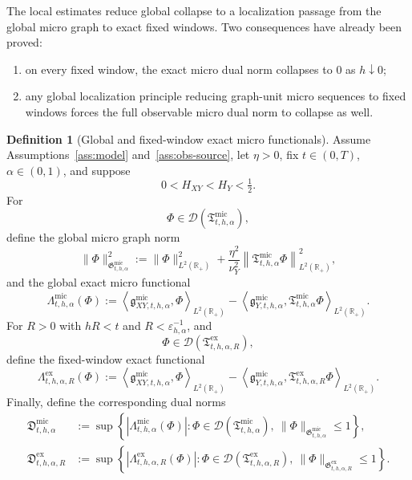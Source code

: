 \documentclass[11pt,a4paper]{amsart}
\theoremstyle{plain}
\theoremstyle{definition}
\newtheorem{definition}[theorem]{Definition}
\theoremstyle{remark}
\newcommand{\R}{\mathbb{R}}
\begin{document}
The local estimates reduce global collapse to a localization passage from the global micro graph to
exact fixed windows.  Two consequences have already been proved:
\begin{enumerate}[label=(\roman*)]
\item on every fixed window, the exact micro dual norm collapses to \(0\) as \(h\downarrow0\);
\item any global localization principle reducing graph-unit micro sequences to fixed windows forces
the full observable micro dual norm to collapse as well.
\end{enumerate}

\begin{definition}[Global and fixed-window exact micro functionals]
\label{def:micro-dual}
Assume Assumptions~\ref{ass:model} and~\ref{ass:obs-source}, let \(\eta>0\), fix \(t\in(0,T)\),
\(\alpha\in(0,1)\), and suppose
\[
0<H_{XY}<H_Y<\tfrac12.
\]
For
\[
\Phi\in\mathcal D(\mathfrak T_{t,h,\alpha}^{\mathrm{mic}}),
\]
define the global micro graph norm
\begin{equation}\label{eq:micro-global-graph-norm}
\|\Phi\|_{\mathfrak G_{t,h,\alpha}^{\mathrm{mic}}}^2
:=
\|\Phi\|_{L^2(\R_+)}^2
+
\frac{\eta^2}{\nu_Y^2}
\left\|
\mathfrak T_{t,h,\alpha}^{\mathrm{mic}}\Phi
\right\|_{L^2(\R_+)}^2,
\end{equation}
and the global exact micro functional
\begin{equation}\label{eq:micro-global-functional}
\Lambda_{t,h,\alpha}^{\mathrm{mic}}(\Phi)
:=
\left\langle
\mathfrak g_{XY,t,h,\alpha}^{\mathrm{mic}},\Phi
\right\rangle_{L^2(\R_+)}
-
\left\langle
\mathfrak g_{Y,t,h,\alpha}^{\mathrm{mic}},
\mathfrak T_{t,h,\alpha}^{\mathrm{mic}}\Phi
\right\rangle_{L^2(\R_+)}.
\end{equation}
For \(R>0\) with \(hR<t\) and \(R<\varepsilon_{h,\alpha}^{-1}\), and
\[
\Phi\in\mathcal D(\mathfrak T_{t,h,\alpha,R}^{\mathrm{ex}}),
\]
define the fixed-window exact functional
\begin{equation}\label{eq:micro-window-functional-ex}
\Lambda_{t,h,\alpha,R}^{\mathrm{ex}}(\Phi)
:=
\left\langle
\mathfrak g_{XY,t,h,\alpha}^{\mathrm{mic}},\Phi
\right\rangle_{L^2(\R_+)}
-
\left\langle
\mathfrak g_{Y,t,h,\alpha}^{\mathrm{mic}},
\mathfrak T_{t,h,\alpha,R}^{\mathrm{ex}}\Phi
\right\rangle_{L^2(\R_+)}.
\end{equation}
Finally, define the corresponding dual norms
\begin{align}
\mathfrak D_{t,h,\alpha}^{\mathrm{mic}}
&:=
\sup\left\{
\left|
\Lambda_{t,h,\alpha}^{\mathrm{mic}}(\Phi)
\right|:
\Phi\in\mathcal D(\mathfrak T_{t,h,\alpha}^{\mathrm{mic}}),
\ \|\Phi\|_{\mathfrak G_{t,h,\alpha}^{\mathrm{mic}}}\le1
\right\},
\label{eq:micro-global-dual}\\
\mathfrak D_{t,h,\alpha,R}^{\mathrm{ex}}
&:=
\sup\left\{
\left|
\Lambda_{t,h,\alpha,R}^{\mathrm{ex}}(\Phi)
\right|:
\Phi\in\mathcal D(\mathfrak T_{t,h,\alpha,R}^{\mathrm{ex}}),
\ \|\Phi\|_{\mathfrak G_{t,h,\alpha,R}^{\mathrm{ex}}}\le1
\right\}.
\label{eq:micro-window-dual}
\end{align}
\end{definition}
\end{document}
